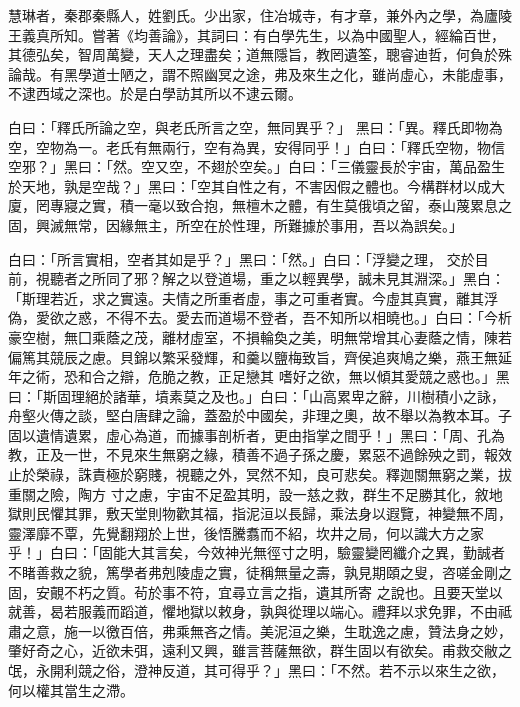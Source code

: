 \begin{pinyinscope}
 慧琳者，秦郡秦縣人，姓劉氏。少出家，住冶城寺，有才章，兼外內之學，為廬陵王義真所知。嘗著《均善論》，其詞曰：有白學先生，以為中國聖人，經綸百世，其德弘矣，智周萬變，天人之理盡矣；道無隱旨，教罔遺筌，聰睿迪哲，何負於殊論哉。有黑學道士陋之，謂不照幽冥之途，弗及來生之化，雖尚虛心，未能虛事，不逮西域之深也。於是白學訪其所以不逮云爾。



 白曰：「釋氏所論之空，與老氏所言之空，無同異乎？」
 黑曰：「異。釋氏即物為空，空物為一。老氏有無兩行，空有為異，安得同乎！」白曰：「釋氏空物，物信空邪？」黑曰：「然。空又空，不翅於空矣。」白曰：「三儀靈長於宇宙，萬品盈生於天地，孰是空哉？」黑曰：「空其自性之有，不害因假之體也。今構群材以成大廈，罔專寢之實，積一毫以致合抱，無檀木之體，有生莫俄頃之留，泰山蔑累息之固，興滅無常，因緣無主，所空在於性理，所難據於事用，吾以為誤矣。」



 白曰：「所言實相，空者其如是乎？」黑曰：「然。」白曰：「浮變之理，
 交於目前，視聽者之所同了邪？解之以登道場，重之以輕異學，誠未見其淵深。」黑白：「斯理若近，求之實遠。夫情之所重者虛，事之可重者實。今虛其真實，離其浮偽，愛欲之惑，不得不去。愛去而道場不登者，吾不知所以相曉也。」白曰：「今析豪空樹，無囗乘蔭之茂，離材虛室，不損輪奐之美，明無常增其心妻蔭之情，陳若偏篤其競辰之慮。貝錦以繁采發輝，和羹以鹽梅致旨，齊侯追爽鳩之樂，燕王無延年之術，恐和合之辯，危脆之教，正足戀其
 嗜好之欲，無以傾其愛競之惑也。」黑曰：「斯固理絕於諸華，墳素莫之及也。」白曰：「山高累卑之辭，川樹積小之詠，舟壑火傳之談，堅白唐肆之論，蓋盈於中國矣，非理之奧，故不舉以為教本耳。子固以遺情遺累，虛心為道，而據事剖析者，更由指掌之間乎！」黑曰：「周、孔為教，正及一世，不見來生無窮之緣，積善不過子孫之慶，累惡不過餘殃之罰，報效止於榮祿，誅責極於窮賤，視聽之外，冥然不知，良可悲矣。釋迦關無窮之業，拔重關之險，陶方
 寸之慮，宇宙不足盈其明，設一慈之救，群生不足勝其化，敘地獄則民懼其罪，敷天堂則物歡其福，指泥洹以長歸，乘法身以遐覽，神變無不周，靈澤靡不覃，先覺翻翔於上世，後悟騰翥而不紹，坎井之局，何以識大方之家乎！」白曰：「固能大其言矣，今效神光無徑寸之明，驗靈變罔纖介之異，勤誠者不睹善救之貌，篤學者弗剋陵虛之實，徒稱無量之壽，孰見期頤之叟，咨嗟金剛之固，安覿不朽之質。茍於事不符，宜尋立言之指，遺其所寄
 之說也。且要天堂以就善，曷若服義而蹈道，懼地獄以敕身，孰與從理以端心。禮拜以求免罪，不由祗肅之意，施一以徼百倍，弗乘無吝之情。美泥洹之樂，生耽逸之慮，贊法身之妙，肇好奇之心，近欲未弭，遠利又興，雖言菩薩無欲，群生固以有欲矣。甫救交敝之氓，永開利競之俗，澄神反道，其可得乎？」黑曰：「不然。若不示以來生之欲，何以權其當生之滯。




\end{pinyinscope}
